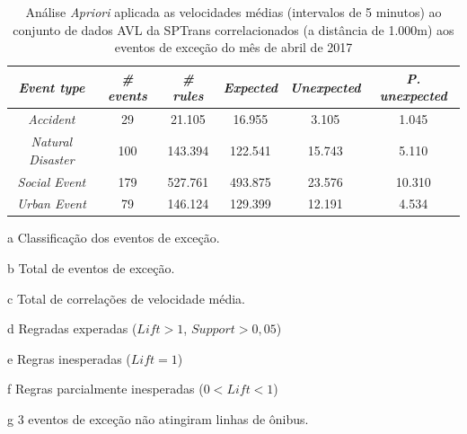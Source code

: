 \documentclass[
	12pt,				%
	oneside,			%
	a4paper,			%
	english,			%
	brazil				%
	]{abntex2ppgsi}
\begin{document}
{{\begin{apendicesenv}
\begin{table}[!htb]
\centering
\begin{threeparttable}
\caption {Análise \textit{Apriori} aplicada as velocidades médias (intervalos de 5 minutos) ao conjunto de dados AVL da SPTrans correlacionados (a distância de 1.000m) aos eventos de exceção do mês de abril de 2017}
\label {tab:aprioriFull}
\begin{tabular}{c|c|c|c|c|c}
\hline
\textbf{\textit{Event type}}\tnote{a} & \textbf{\textit{\# events}}\tnote{b} & \textit{\textbf{\# rules}}\tnote{c} & \textbf{\textit{Expected}}\tnote{d} & \textbf{\textit{Unexpected}}\tnote{e} & \textbf{\textit{P. unexpected}}\tnote{f}   \\
\hline
\textit{Accident} & 29 & 21.105 & 16.955 & 3.105 & 1.045 \\
\textit{Natural Disaster} & 100 & 143.394 & 122.541 & 15.743 & 5.110 \\
\textit{Social Event} & 179 & 527.761 & 493.875 & 23.576 & 10.310 \\
\textit{Urban Event} & 79 & 146.124 & 129.399 & 12.191 & 4.534 \\
\hline
\end{tabular}
\begin{tablenotes}
            \item[a] Classificação dos eventos de exceção.
            \item[b] Total de eventos de exceção.
            \item[c] Total de correlações de velocidade média.
            \item[d] Regradas experadas ($Lift > 1$, $Support > 0,05$)
            \item[e] Regras inesperadas ($Lift = 1$)
            \item[f] Regras parcialmente inesperadas ($0 < Lift < 1$)
            \item[g] 3 eventos de exceção não atingiram linhas de ônibus.
        \end{tablenotes}
\end{threeparttable}
\end{table}



\end{apendicesenv}}}
\end{document}
